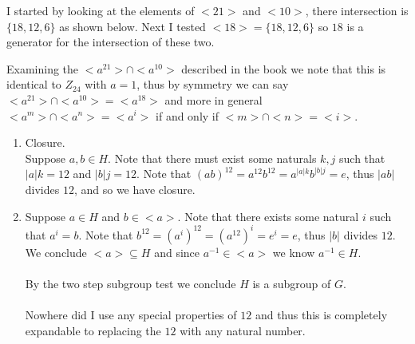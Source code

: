 \documentclass[12pt]{article}
\makeatletter
\theoremstyle{homework}
\newenvironment{exercise}[1]
{\def\@currentlabel{#1}\exercisecore}
{\endexercisecore}
\makeatother
\begin{document}
\begin{exercise}
{4.13}
I started by looking at the elements of $<21>$ and $<10>$, there intersection is $\{18,12,6\}$ as shown below.  Next I tested $<18>=\{18,12,6\}$ so $18$ is a generator for the intersection of these two.

Examining the $<a^{21}>\cap <a^{10}>$ described in the book we note that this is identical to $Z_{24}$ with $a=1$, thus by symmetry we can say $<a^{21}>\cap <a^{10}>=<a^{18}>$ and more in general $<a^{m}>\cap <a^{n}>=<a^{i}>$ if and only if $<m>\cap <n>=<i>$.
\end{exercise}
\begin{exercise}
{4.15}
\begin{enumerate}
\item
Closure.\\
Suppose $a,b\in H$.  Note that there must exist some naturals $k,j$ such that $|a|k=12$ and $|b|j=12$.  Note that $(ab)^{12}=a^{12}b^{12}=a^{|a|k}b^{|b|j}=e$, thus $|ab|$ divides $12$, and so we have closure.\
\item
Suppose $a\in H$ and $b\in <a>$.  Note that there exists some natural $i$ such that $a^i=b$.  Note that $b^{12}=(a^i)^{12}=(a^{12})^i=e^i=e$, thus $|b|$ divides $12$.  We conclude $<a>\subseteq H$ and since $a^{-1}\in <a>$ we know $a^{-1}\in H$.\\\\
By the two step subgroup test we conclude $H$ is a subgroup of $G$.\\\\
Nowhere did I use any special properties of $12$ and thus this is completely expandable to replacing the $12$ with any natural number.
\end{enumerate}
\end{exercise}
\end{document}
